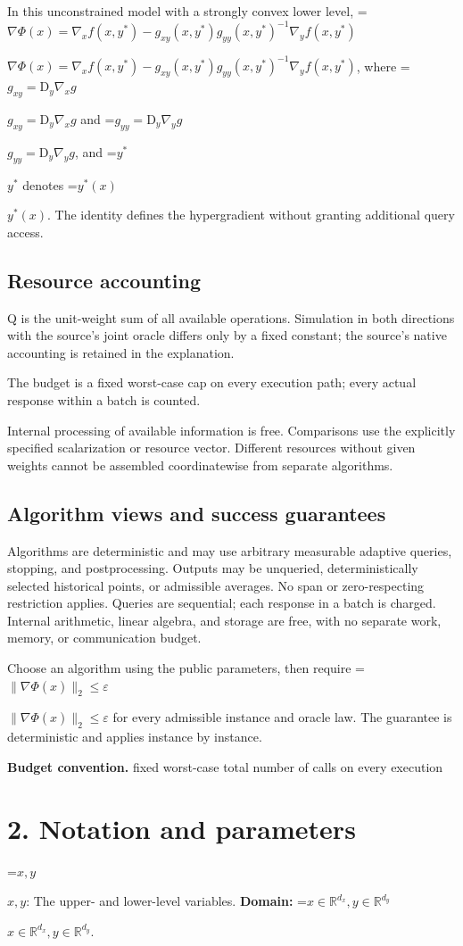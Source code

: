 \documentclass[10pt,a4paper]{article}
\newcommand{\AtlasMath}[1]{\par\begingroup\centering\setbox0=\hbox{$\displaystyle #1$}\ifdim\wd0>1.4\linewidth\typeout{ATLAS WIDE FORMULA: \the\wd0}\fi\ifdim\wd0>\linewidth\resizebox{\linewidth}{!}{\box0}\else\box0\fi\par\endgroup}
\newcommand{\AtlasInlineMath}[1]{\begingroup\setbox0=\hbox{$#1$}\ifdim\wd0>.4\linewidth\endgroup\AtlasMath{#1}\else\endgroup$#1$\fi}
\begin{document}
In this unconstrained model with a strongly convex lower level, \AtlasInlineMath{\nabla\Phi(x)=\nabla_x f(x,y^*)-g_{xy}(x,y^*)g_{yy}(x,y^*)^{-1}\nabla_y f(x,y^*)}, where \AtlasInlineMath{g_{xy}=\mathrm{D}_y\nabla_x g} and \AtlasInlineMath{g_{yy}=\mathrm{D}_y\nabla_y g}, and \AtlasInlineMath{y^*} denotes \AtlasInlineMath{y^*(x)}. The identity defines the hypergradient without granting additional query access.

\subsection{Resource accounting}
Q is the unit-weight sum of all available operations. Simulation in both directions with the source's joint oracle differs only by a fixed constant; the source's native accounting is retained in the explanation.

The budget is a fixed worst-case cap on every execution path; every actual response within a batch is counted.

Internal processing of available information is free. Comparisons use the explicitly specified scalarization or resource vector. Different resources without given weights cannot be assembled coordinatewise from separate algorithms.

\subsection{Algorithm views and success guarantees}
Algorithms are deterministic and may use arbitrary measurable adaptive queries, stopping, and postprocessing. Outputs may be unqueried, deterministically selected historical points, or admissible averages. No span or zero-respecting restriction applies. Queries are sequential; each response in a batch is charged. Internal arithmetic, linear algebra, and storage are free, with no separate work, memory, or communication budget.

Choose an algorithm using the public parameters, then require \AtlasInlineMath{\|\nabla\Phi(\widehat{x})\|_2\le\varepsilon} for every admissible instance and oracle law. The guarantee is deterministic and applies instance by instance.

\textbf{Budget convention.} fixed worst-case total number of calls on every execution

\section{2. Notation and parameters}
\AtlasInlineMath{x,y}: The upper- and lower-level variables. \textbf{Domain:} \AtlasInlineMath{x\in\mathbb R^{d_x},y\in\mathbb R^{d_y}}.
\end{document}
